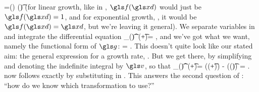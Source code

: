 \be
\gd\xd=\gf(\xd) \gd(\g \t)
\ee
(for linear growth, like in , $\gf(\xd)$ would just be $\gf(\xd)=1$, and for exponential growth, , 
it would be $\gf(\xd)=\xd$, but we're leaving it general). We separate variables in  and integrate the differential equation
\be
\int_{\xd(\t)}^{\xd(\t+\Dt)}\gd\xd = \g \Dt,
\ee
and we've got what we want, namely the functional form of $\g$:
\be
\g= .
\ee
This doesn't quite look like our stated aim: the general expression for a growth rate, . But we get there, by simplifying  and denoting the indefinite integral by $\gv$, so that
\be
\int_{\xd(\t)}^{\xd(\t+\Dt)}\gd\xd  = \gv(\xd(\t+\Dt)) - \gv(\xd(\t)) = \Delta \gv.
\ee
{} now follows exactly by substituting  in . This answers the second question of : ``how do we know which transformation to use?''


%
%
%
%
%
%


